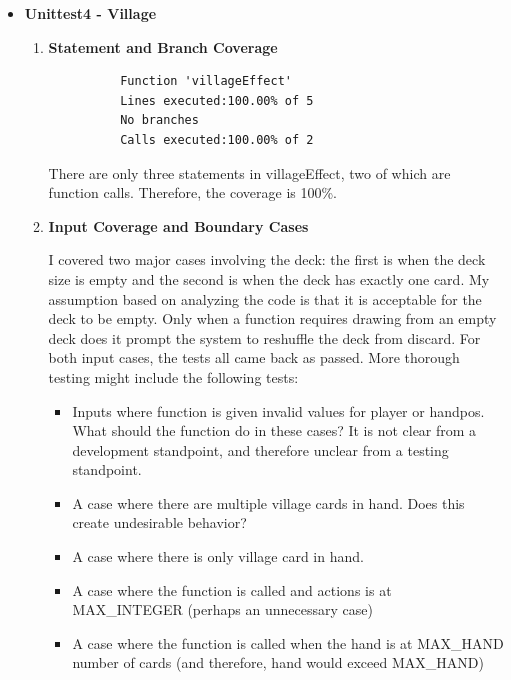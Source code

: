 \documentclass[11pt,letterpaper]{article}
\begin{document}
\begin{enumerate}[label=\Roman*.]
\begin{itemize}[leftmargin=*]
      \item \textbf{Unittest4 - Village}
      
        \begin{enumerate}[leftmargin=*]
          \item \textbf{Statement and Branch Coverage}

          \begin{lstlisting}
          Function 'villageEffect'
          Lines executed:100.00% of 5
          No branches
          Calls executed:100.00% of 2
          \end{lstlisting}
          
            There are only three statements in villageEffect, two of which are
            function calls. Therefore, the coverage is 100\%.

        \item \textbf{Input Coverage and Boundary Cases}

          I covered two major cases involving the deck: the first is when the deck size is empty and 
            the second is when the deck has exactly one card. My assumption based on analyzing the
            code is that it is acceptable for the deck to be empty. Only when a function requires
            drawing from an empty deck does it prompt the system to reshuffle the deck from discard.
            For both input cases, the tests all came back as passed. More thorough testing might
            include the following tests:
          \begin{itemize}
            \item Inputs where function is given invalid values for player or handpos. What
                should the function do in these cases? It is not clear from a development
                standpoint, and therefore unclear from a testing standpoint. 
            \item A case where there are multiple village cards in hand. Does this create
              undesirable behavior?
            \item A case where there is only village card in hand.
            \item A case where the function is called and actions is at MAX\_INTEGER (perhaps an unnecessary case)
            \item A case where the function is called when the hand is at MAX\_HAND number of cards (and therefore, hand would exceed MAX\_HAND)
          \end{itemize}
        \end{enumerate}


\end{itemize}
\end{enumerate}
\end{document}
